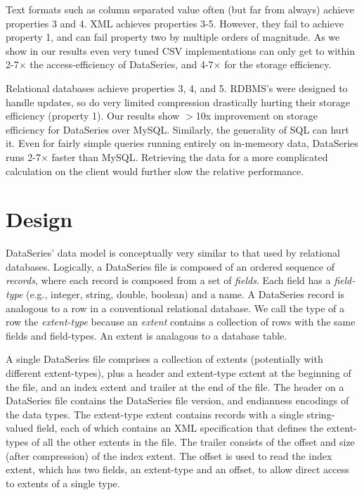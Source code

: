 \documentclass{acm_proc_article-sp}
\begin{document}
Text formats such as column separated value often (but far from always)
achieve properties 3 and 4. XML achieves properties 3-5.  However,
they fail to achieve property 1, and can fail property two by multiple
orders of magnitude.  As we show in our results even very tuned CSV
implementations can only get to within 2-7$\times$ the
access-efficiency of DataSeries, and 4-7$\times$ for the storage
efficiency.  

Relational databases achieve properties 3, 4, and 5. RDBMS's were
designed to handle updates, so do very limited compression drastically
hurting their storage efficiency (property 1).  Our results show
$>$10x improvement on storage efficiency for DataSeries over
MySQL. 
Similarly, the generality of SQL can hurt it.  Even for fairly simple
queries running entirely on in-memeory data, DataSeries runs 2-7$\times$
faster than MySQL. 
Retrieving the data for a more complicated
calculation on the client would further slow the relative performance.

\section{Design}\label{sec:design}

DataSeries' data model is conceptually very similar to that used by
relational databases.  Logically, a DataSeries file is composed of an
ordered sequence of {\it records}, where each record is composed from
a set of {\it fields}. Each field has a {\it field-type} (e.g.,
integer, string, double, boolean) and a name. A DataSeries record is
analogous to a row in a conventional relational database. We call the
type of a row the {\it extent-type} because an {\it extent} contains a
collection of rows with the same fields and field-types. An extent is
analagous to a database table.

A single DataSeries file comprises a collection of extents
(potentially with different extent-types), plus a header and
extent-type extent at the beginning of the file, and an index extent
and trailer at the end of the file. The header on a DataSeries file 
contains the DataSeries
file version, and endianness encodings of the data types.  The
extent-type extent contains records with a single string-valued field,
each of which contains an XML specification that defines the
extent-types of all the other extents in the file. The trailer
consists of the offset and size (after compression) of the index
extent.  The offset is used to read the index extent, which has two
fields, an extent-type and an offset, to allow direct access to
extents of a single type.
\end{document}
